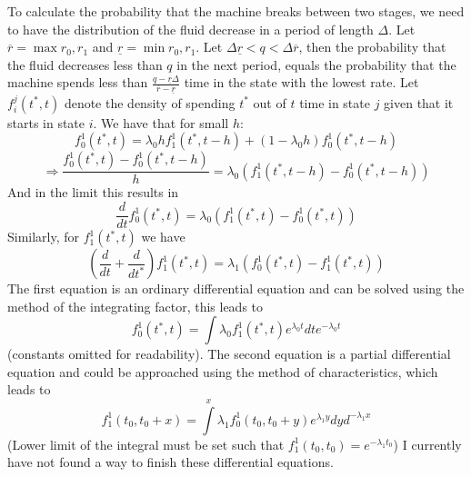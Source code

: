 To calculate the probability that the machine breaks between two stages, we need to have the distribution of the fluid decrease in a period of length $\Delta$. Let $\overline{r}=\max{r_0,r_1}$ and $\underline{r}=\min{r_0,r_1}$. Let $\Delta\underline{r}<q<\Delta\overline{r}$, then the probability that the fluid decreases less than $q$ in the next period, equals the probability that the machine spends less than $\frac{q-\underline{r}\Delta}{\overline{r}-\underline{r}}$ time in the state with the lowest rate.
Let $f_{i}^j(t^*,t)$ denote the density of spending $t^*$ out of $t$ time in state $j$ given that it starts in state $i$. We have that for small $h$:
$$
f_{0}^1(t^*,t)=\lambda_0hf_1^1(t^*,t-h)+(1-\lambda_0h)f_{0}^1(t^*,t-h)
$$
$$
\Rightarrow \frac{f_{0}^1(t^*,t)-f_{0}^1(t^*,t-h)}{h}=\lambda_0(f_1^1(t^*,t-h)-f_{0}^1(t^*,t-h))
$$
And in the limit this results in
$$
\frac{d}{dt}f_{0}^1(t^*,t)=\lambda_0(f_1^1(t^*,t)-f_{0}^1(t^*,t))
$$
Similarly, for $f_1^1(t^*,t)$ we have
$$
(\frac{d}{dt}+\frac{d}{dt^*})f_1^1(t^*,t)=\lambda_1(f_0^1(t^*,t)-f_1^1(t^*,t))
$$
The first equation is an ordinary differential equation and can be solved using the method of the integrating factor, this leads to
$$
f_0^1(t^*,t)=\int\lambda_0f_1^1(t^*,t)e^{\lambda_0t}dte^{-\lambda_0t}
$$
(constants omitted for readability). The second equation is a partial differential equation and could be approached using the method of characteristics, which leads to
$$
f_1^1(t_0,t_0+x)=\int\limits^{x}\lambda_1f_0^1(t_0,t_0+y)e^{\lambda_1y}dyd^{-\lambda_1x}
$$
(Lower limit of the integral must be set such that $f_1^1(t_0,t_0)=e^{-\lambda_1t_0}$)
I currently have not found a way to finish these differential equations.


